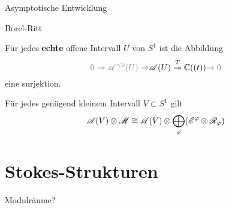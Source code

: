\begin{frame}[t]{Asymptotische Entwicklung}
  
\end{frame}
\begin{frame}[t]{Borel-Ritt}
  \begin{llem}
    Für jedes \textbf{echte} offene Intervall $U$ von $S^1$ ist die Abbildung
    \[
      \textcolor{gray}{0\to \sA^{<0}(U) \to}
      \sA(U) \overset{T}\twoheadrightarrow \C((t))
      \textcolor{gray}{\to0}
    \]
    eine surjektion.
  \end{llem}
  \begin{thm}
    Für jedes genügend kleinem Intervall $V\subset S^1$ gilt
    \[
      \mathscr{A}(V)\otimes\mathscr{M}\cong\mathscr{A}(V)\otimes\bigoplus_\varphi(\mathscr{E}^\varphi\otimes\mathscr{R}_\varphi)
    \]
  \end{thm}
\end{frame}

\section{Stokes-Strukturen}
\begin{frame}[t]{Modulräume?}
  
\end{frame}

